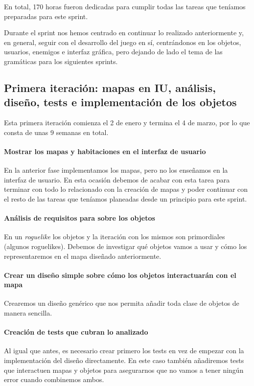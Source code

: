 En total, 170 horas fueron dedicadas para cumplir todas las tareas que teníamos preparadas para este sprint.

Durante el sprint nos hemos centrado en continuar lo realizado anteriormente y, en general, seguir con el desarrollo del juego en sí, centrándonos en los objetos, usuarios, enemigos e interfaz gráfica, pero dejando de lado el tema de las gramáticas para los siguientes sprints.

\subsection{Primera iteración: mapas en IU, análisis, diseño, tests e implementación de los objetos}

Esta primera iteración comienza el 2 de enero y termina el 4 de marzo, por lo que consta de unas 9 semanas en total.

\paragraph{Mostrar los mapas y habitaciones en el interfaz de usuario} En la anterior fase implementamos los mapas, pero no los enseñamos en la interfaz de usuario. En esta ocasión debemos de acabar con esta tarea para terminar con todo lo relacionado con la creación de mapas y poder continuar con el resto de las tareas que teníamos planeadas desde un principio para este sprint.

\paragraph{Análisis de requisitos para sobre los objetos} En un \textit{roguelike} los objetos y la iteración con los mismos son primordiales (algunos roguelikes). Debemos de investigar qué objetos vamos a usar y cómo los representaremos en el mapa diseñado anteriormente.

\paragraph{Crear un diseño simple sobre cómo los objetos interactuarán con el mapa} Crearemos un diseño genérico que nos permita añadir toda clase de objetos de manera sencilla.

\paragraph{Creación de tests que cubran lo analizado} Al igual que antes, es necesario crear primero los tests en vez de empezar con la implementación del diseño directamente. En este caso también añadiremos tests que interactuen mapas y objetos para asegurarnos que no vamos a tener ningún error cuando combinemos ambos.

